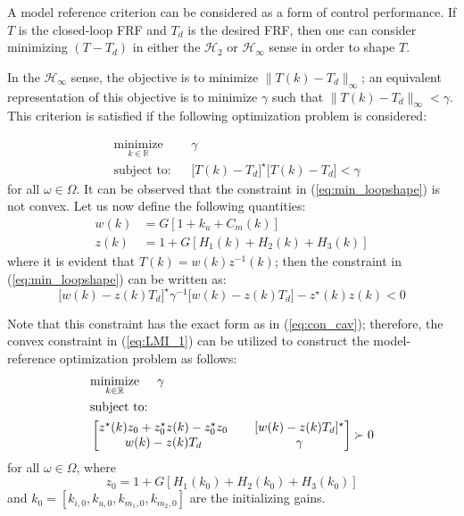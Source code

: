 \documentclass[a4paper, 10pt, conference]{ieeeconf}
\begin{document}
A model reference criterion can be considered as a form of control performance. If $T$ is the closed-loop FRF and $T_d$ is the desired FRF, then one can consider minimizing $(T-T_d)$ in either the $\mathcal{H}_2$ or $\mathcal{H}_\infty$ sense in order to shape $T$. 

In the $\mathcal{H}_\infty$ sense, the objective is to minimize $ \|T(k) - T_d \|_\infty$; an equivalent representation of this objective is to minimize $\gamma$ such that $ \|T(k) - T_d \|_\infty < \gamma$. This criterion is satisfied if the following optimization problem is considered:
 
 \begin{equation} \label{eq:min_loopshape}
\begin{aligned}
& \underset{ k \in \mathbb{R}}{\text{minimize}}
& & \gamma  \\
& \text{subject to:} & & \bigl[T(k)-T_d\bigr]^{\star}\bigl[T(k)-T_d\bigr] < \gamma
\end{aligned}
\end{equation}
for all $\omega \in \Omega$. It can be observed that the constraint in (\ref{eq:min_loopshape}) is not convex. Let us now define the following quantities:
\begin{equation} 
\begin{aligned}
w(k) &= G[1+k_u+C_m(k)] \\
z(k) &= 1+G[H_1(k)+H_2(k)+H_3(k)]
\end{aligned}
\end{equation}
where it is evident that $T(k) = w(k)z^{-1}(k)$; then the constraint in (\ref{eq:min_loopshape}) can be written as:
$$
\bigl[w(k)-z(k)T_d \bigr]^{\star}\gamma^{-1} \bigl[w(k)-z(k)T_d \bigr] - z^{\star}(k)z(k)<0
$$

Note that this constraint has the exact form as in (\ref{eq:con_cav}); therefore, the convex constraint in (\ref{eq:LMI_1}) can be utilized to construct the model-reference optimization problem as follows:
\begin{equation} \label{eq:loop_shape_LMI_inf}
\begin{aligned}
& \underset{ k \in \mathbb{R}}{\text{minimize}} \hspace{0.5cm} \gamma  \\
& \text{subject to:} \\
&
\begin{bmatrix}
z^{\star}(k)z_0 + z_0^{\star}z(k) - z_0^{\star}z_0 & \phantom{xx}[w(k)-z(k)T_d]^{\star} \\ 
w(k)-z(k)T_d & \phantom{xx}\gamma
\end{bmatrix} \succ 0
\end{aligned}
\end{equation}
for all $\omega \in \Omega$, where $$z_0 = 1+G[H_1(k_0) + H_2(k_0)+H_3(k_0)]$$ and $k_0 =[k_{i,0},k_{u,0},k_{m_1,0},k_{m_2,0}  ]$ are the initializing gains. 
\end{document}
